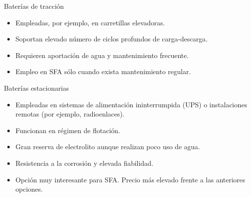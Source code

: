 \documentclass[xcolor={usenames,svgnames,dvipsnames}]{beamer}
\begin{document}
\begin{frame}[label={sec:org956ba3f}]{Baterías de tracción}
\begin{itemize}
\item Empleadas, por ejemplo, en \alert{carretillas elevadoras}.

\item Soportan \alert{elevado número de ciclos profundos de carga-descarga}.

\item Requieren \alert{aportación de agua} y \alert{mantenimiento frecuente}.

\item Empleo en SFA sólo cuando exista mantenimiento regular.
\end{itemize}
\end{frame}

\begin{frame}[label={sec:orgda568d8}]{Baterías estacionarias}
\begin{itemize}
\item Empleadas en sistemas de alimentación ininterrumpida (\alert{UPS}) o instalaciones remotas (por ejemplo, radioenlaces).

\item Funcionan en \alert{régimen de flotación}.

\item Gran reserva de electrolito aunque realizan poco uso de agua.

\item \alert{Resistencia a la corrosión} y elevada fiabilidad.

\item \alert{Opción muy interesante para SFA}. Precio más elevado frente a las anteriores opciones.
\end{itemize}
\end{frame}
\end{document}
